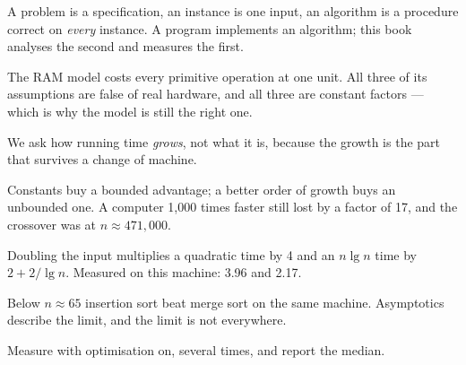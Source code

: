 \begin{chaptersummary}
\begin{tight}
  \item A problem is a specification, an instance is one input, an algorithm is
        a procedure correct on \emph{every} instance. A program implements an
        algorithm; this book analyses the second and measures the first.
  \item The RAM model costs every primitive operation at one unit. All three of
        its assumptions are false of real hardware, and all three are constant
        factors --- which is why the model is still the right one.
  \item We ask how running time \emph{grows}, not what it is, because the
        growth is the part that survives a change of machine.
  \item Constants buy a bounded advantage; a better order of growth buys an
        unbounded one. A computer 1{,}000 times faster still lost by a factor
        of 17, and the crossover was at $n \approx 471{,}000$.
  \item Doubling the input multiplies a quadratic time by 4 and an $n \lg n$
        time by $2 + 2/\lg n$. Measured on this machine: 3.96 and 2.17.
  \item Below $n \approx 65$ insertion sort beat merge sort on the same
        machine. Asymptotics describe the limit, and the limit is not
        everywhere.
  \item Measure with optimisation on, several times, and report the median.
\end{tight}
\end{chaptersummary}

